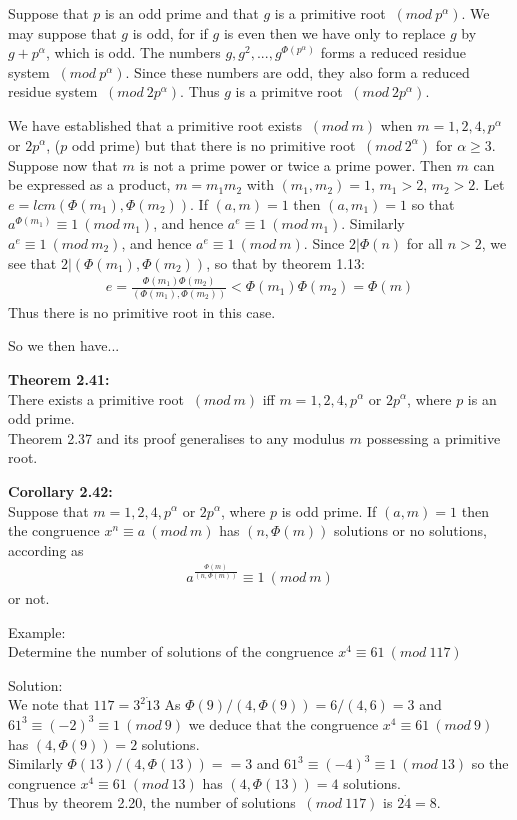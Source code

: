 \documentclass[a4paper]{article}
\begin{document}
Suppose that $p$ is an odd prime and that $g$ is a primitive root $\ (mod\ p^{\alpha})$. We may suppose that $g$ is odd, for if $g$ is even then we have only to replace $g$ by $g+p^{\alpha}$, which is odd. The numbers $g,g^2,...,g^{\Phi(p^{\alpha})}$ forms a reduced residue system $\ (mod\ p^{\alpha})$. Since these numbers are odd, they also form a reduced residue system $\ (mod\ 2p^{\alpha})$. Thus $g$ is a primitve root $\ (mod\ 2p^{\alpha})$.

We have established that a primitive root exists $\ (mod\ m)$ when $m=1,2,4,p^{\alpha}$ or $2p^{\alpha}$, ($p$ odd prime) but that there is no primitive root $\ (mod\ 2^{\alpha})$ for $\alpha\geq 3$. Suppose now that $m$ is not a prime power or twice a prime power. Then $m$ can be expressed as a product, $m=m_1m_2$ with $(m_1,m_2)=1$, $m_1>2$, $m_2>2$. Let $e=lcm(\Phi(m_1),\Phi(m_2))$. If $(a,m)=1$ then $(a,m_1)=1$ so that $a^{\Phi(m_1)} \equiv 1 \ (mod\ m_1)$, and hence $a^e \equiv 1 \ (mod\ m_1)$. Similarly $a^e \equiv 1 \ (mod\ m_2)$, and hence $a^e \equiv 1 \ (mod\ m)$.
Since $2|\Phi(n)$ for all $n>2$, we see that $2|(\Phi(m_1),\Phi(m_2))$, so that by theorem 1.13:
\begin{align*}
    e = \frac{\Phi(m_1)\Phi(m_2)}{(\Phi(m_1),\Phi(m_2))} < \Phi(m_1)\Phi(m_2) = \Phi(m)
\end{align*}
Thus there is no primitive root in this case.

So we then have...

\textbf{Theorem 2.41:}\\
There exists a primitive root $\ (mod\ m)$ iff $m=1,2,4,p^{\alpha}$ or $2p^{\alpha}$, where $p$ is an odd prime.\\
Theorem 2.37 and its proof generalises to any modulus $m$ possessing a primitive root.

\textbf{Corollary 2.42:}\\
Suppose that $m=1,2,4,p^{\alpha}$ or $2p^{\alpha}$, where $p$ is odd prime. If $(a,m)=1$ then the congruence $x^n \equiv a \ (mod\ m)$ has $(n,\Phi(m))$ solutions or no solutions, according as
\begin{align*}
    a^{\frac{\Phi(m)}{(n,\Phi(m))}} \equiv 1 \ (mod\ m)
\end{align*}
or not.

Example:\\
Determine the number of solutions of the congruence $x^4 \equiv 61 \ (mod\ 117)$

Solution:\\
We note that $117 = 3^2\dot 13$
As $\Phi(9)/(4,\Phi(9))=6/(4,6)=3$ and $61^3 \equiv (-2)^3 \equiv 1 \ (mod\ 9)$ we deduce that the congruence $x^4 \equiv 61 \ (mod\ 9)$ has $(4,\Phi(9))=2$ solutions.\\
Similarly $\Phi(13)/(4,\Phi(13))==3$ and $61^3 \equiv (-4)^3 \equiv  1 \ (mod\ 13)$ so the congruence $x^4 \equiv 61 \ (mod\ 13)$ has $(4,\Phi(13))=4$ solutions.\\
Thus by theorem 2.20, the number of solutions $\ (mod\ 117)$ is $2\dot4 = 8$.
\end{document}
